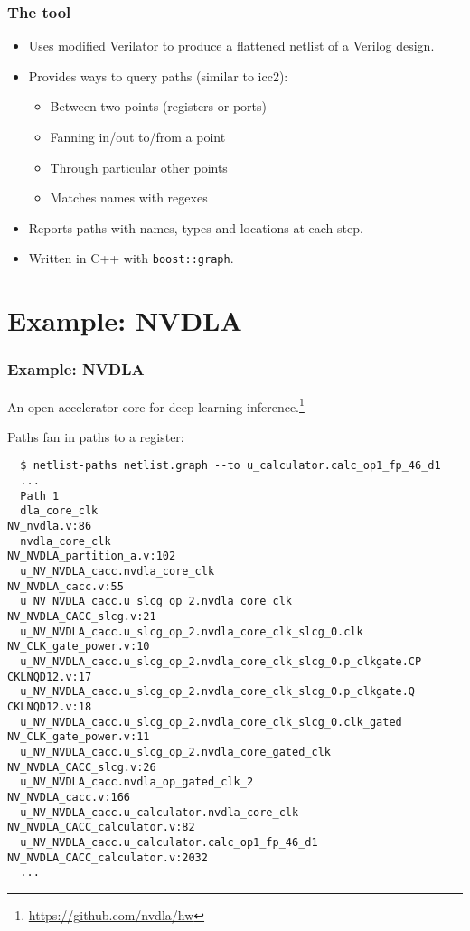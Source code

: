 \documentclass[professionalfonts]{beamer}
\begin{document}
\begin{frame}
  \frametitle{The tool}
  \begin{itemize}
  \item Uses modified Verilator to produce a flattened netlist of a Verilog design.
  \item Provides ways to query paths (similar to icc2):
    \begin{itemize}
    \item Between two points (registers or ports)
    \item Fanning in/out to/from a point
    \item Through particular other points
    \item Matches names with regexes
    \end{itemize}
  \item Reports paths with names, types and locations at each step.
  \item Written in C++ with \texttt{boost::graph}.
  \end{itemize}
\end{frame}

\section{Example: NVDLA}
\begin{frame}[fragile]
  \frametitle{Example: NVDLA}
  An open accelerator core for deep learning inference.\footnote{\url{https://github.com/nvdla/hw}}

  Paths fan in paths to a register:
  \tiny
  \begin{verbatim}
  $ netlist-paths netlist.graph --to u_calculator.calc_op1_fp_46_d1
  ...
  Path 1
  dla_core_clk                                                   NV_nvdla.v:86
  nvdla_core_clk                                                 NV_NVDLA_partition_a.v:102
  u_NV_NVDLA_cacc.nvdla_core_clk                                 NV_NVDLA_cacc.v:55
  u_NV_NVDLA_cacc.u_slcg_op_2.nvdla_core_clk                     NV_NVDLA_CACC_slcg.v:21
  u_NV_NVDLA_cacc.u_slcg_op_2.nvdla_core_clk_slcg_0.clk          NV_CLK_gate_power.v:10
  u_NV_NVDLA_cacc.u_slcg_op_2.nvdla_core_clk_slcg_0.p_clkgate.CP CKLNQD12.v:17
  u_NV_NVDLA_cacc.u_slcg_op_2.nvdla_core_clk_slcg_0.p_clkgate.Q  CKLNQD12.v:18
  u_NV_NVDLA_cacc.u_slcg_op_2.nvdla_core_clk_slcg_0.clk_gated    NV_CLK_gate_power.v:11
  u_NV_NVDLA_cacc.u_slcg_op_2.nvdla_core_gated_clk               NV_NVDLA_CACC_slcg.v:26
  u_NV_NVDLA_cacc.nvdla_op_gated_clk_2                           NV_NVDLA_cacc.v:166
  u_NV_NVDLA_cacc.u_calculator.nvdla_core_clk                    NV_NVDLA_CACC_calculator.v:82
  u_NV_NVDLA_cacc.u_calculator.calc_op1_fp_46_d1                 NV_NVDLA_CACC_calculator.v:2032
  ...
  \end{verbatim}
\end{frame}
\end{document}
